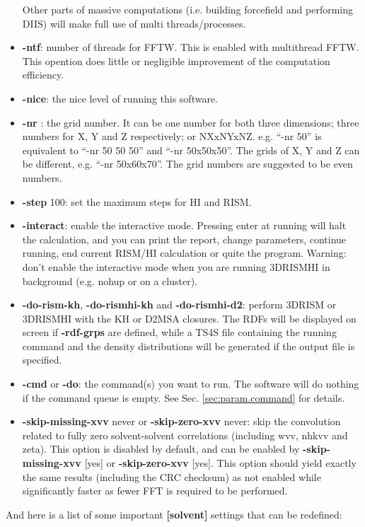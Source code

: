 \documentclass[aip,amsmath,amssymb,reprint,onecolumn]{revtex4-1}
\begin{document}
\begin{itemize}
        Other parts of massive computations (i.e. building forcefield and performing DIIS) will make full use of multi threads/processes.
    \item {\bf -ntf}: number of threads for FFTW. This is enabled with multithread FFTW. This opention does little or negligible improvement of the computation efficiency.
    \item {\bf -nice}: the nice level of running this software.
    \item {\bf -nr }: the grid number. It can be one number for both three dimensions; three numbers for X, Y and Z respectively; or NXxNYxNZ. e.g. ``-nr 50'' is equivalent to ``-nr 50 50 50'' and ``-nr 50x50x50''. The grids of X, Y and Z can be different, e.g. ``-nr 50x60x70''. The grid numbers are suggested to be even numbers.
    \item {\bf -step} 100: set the maximum steps for HI and RISM.
    \item {\bf -interact}: enable the interactive mode. Pressing enter at running will halt the calculation, and you can print the report, change parameters, continue running, end current RISM/HI calculation or quite the program. Warning: don't enable the interactive mode when you are running 3DRISMHI in background (e.g. nohup or on a cluster).
    \item {\bf -do-rism-kh}, {\bf -do-rismhi-kh} and {\bf -do-rismhi-d2}: perform 3DRISM or 3DRISMHI with the KH or D2MSA closures. The RDFs will be displayed on screen if {\bf -rdf-grps} are defined, while a TS4S file containing the running command and the density distributions will be generated if the output file is specified.
    \item {\bf -cmd} or {\bf -do}: the command(s) you want to run. The software will do nothing if the command queue is empty. See Sec. \ref{sec:param.command} for details.
    \item {\bf -skip-missing-xvv} never or {\bf -skip-zero-xvv} never: skip the convolution related to fully zero solvent-solvent correlations (including wvv, nhkvv and zeta). This option is disabled by default, and can be enabled by {\bf -skip-missing-xvv} [yes] or {\bf -skip-zero-xvv} [yes]. This option should yield exactly the same results (including the CRC checksum) as not enabled while significantly faster as fewer FFT is required to be performed.
\end{itemize}

And here is a list of some important {\bf [solvent]} settings that can be redefined:
\end{document}
